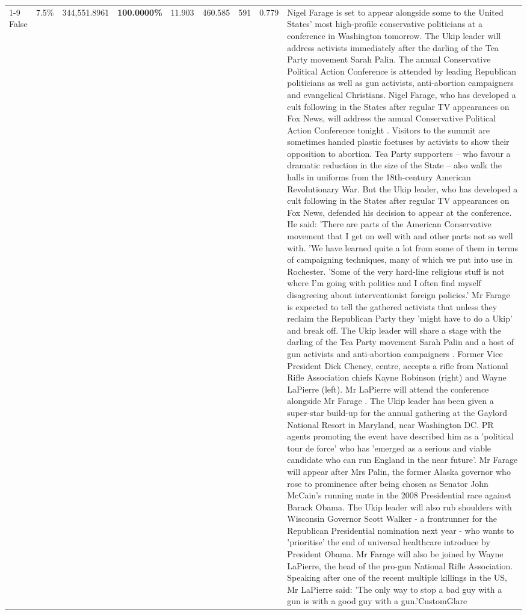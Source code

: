 \begin{table}[H]
\begin{tabular}{lllrlllll}
\cline{1-9}
False & 7.5\% & 344,551.8961 & \bfseries \color{red} 100.0000\% & 11.903 & 460.585 & 591 & 0.779 & Nigel Farage is set to appear alongside some to the United States' most high-profile conservative politicians at a conference in Washington tomorrow. The Ukip leader will address activists immediately after the darling of the Tea Party movement Sarah Palin. The annual Conservative Political Action Conference is attended by leading Republican politicians as well as gun activists, anti-abortion campaigners and evangelical Christians. Nigel Farage, who has developed a cult following in the States after regular TV appearances on Fox News, will address the annual Conservative Political Action Conference tonight . Visitors to the summit are sometimes handed plastic foetuses by activists to show their opposition to abortion. Tea Party supporters – who favour a dramatic reduction in the size of the State – also walk the halls in uniforms from the 18th-century American Revolutionary War. But the Ukip leader, who has developed a cult following in the States after regular TV appearances on Fox News, defended his decision to appear at the conference. He said: 'There are parts of the American Conservative movement that I get on well with and other parts not so well with. 'We have learned quite a lot from some of them in terms of campaigning techniques, many of which we put into use in Rochester. 'Some of the very hard-line religious stuff is not where I'm going with politics and I often find myself disagreeing about interventionist foreign policies.' Mr Farage is expected to tell the gathered activists that unless they reclaim the Republican Party they 'might have to do a Ukip' and break off. The Ukip leader will share a stage with the darling of the Tea Party movement Sarah Palin and a host of gun activists and anti-abortion campaigners . Former Vice President Dick Cheney, centre, accepts a rifle from National Rifle Association chiefs Kayne Robinson (right) and Wayne LaPierre (left). Mr LaPierre will attend the conference alongside Mr Farage . The Ukip leader has been given a super-star build-up for the annual gathering at the Gaylord National Resort in Maryland, near Washington DC. PR agents promoting the event have described him as a 'political tour de force' who has 'emerged as a serious and viable candidate who can run England in the near future'. Mr Farage will appear after Mrs Palin, the former Alaska governor who rose to prominence after being chosen as Senator John McCain's running mate in the 2008 Presidential race against Barack Obama. The Ukip leader will also rub shoulders with Wisconsin Governor Scott Walker - a frontrunner for the Republican Presidential nomination next year - who wants to 'prioritise' the end of universal healthcare introduce by President Obama. Mr Farage will also be joined by Wayne LaPierre, the head of the pro-gun National Rifle Association. Speaking after one of the recent multiple killings in the US, Mr LaPierre said: 'The only way to stop a bad guy with a gun is with a good guy with a gun.'CustomGlare \\

\end{tabular}
\end{table}
